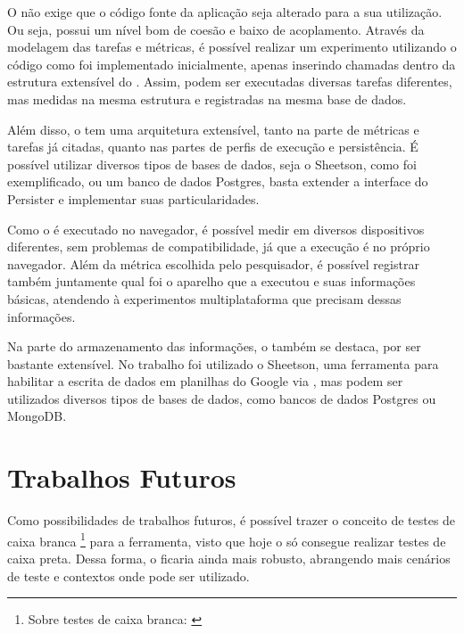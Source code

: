 \documentclass[12pt]{tcc}
\begin{document}
O  não exige que o código fonte da aplicação seja alterado para a sua utilização. Ou seja, possui um nível bom de coesão e baixo de acoplamento. Através da modelagem das tarefas e métricas, é possível realizar um experimento utilizando o código como foi implementado inicialmente, apenas inserindo chamadas dentro da estrutura extensível do . Assim, podem ser executadas diversas tarefas diferentes, mas medidas na mesma estrutura e registradas na mesma base de dados.

Além disso, o  tem uma arquitetura extensível, tanto na parte de métricas e tarefas já citadas, quanto nas partes de perfis de execução e persistência. É possível utilizar diversos tipos de bases de dados, seja o Sheetson, como foi exemplificado, ou um banco de dados Postgres, basta extender a interface do Persister e implementar suas particularidades. 

Como o  é executado no navegador, é possível medir em diversos dispositivos diferentes, sem problemas de compatibilidade, já que a execução é no próprio navegador. Além da métrica escolhida pelo pesquisador, é possível registrar também juntamente qual foi o aparelho que a executou e suas informações básicas, atendendo à experimentos multiplataforma que precisam dessas informações.

Na parte do armazenamento das informações, o  também se destaca, por ser bastante extensível. No trabalho foi utilizado o Sheetson, uma ferramenta para habilitar a escrita de dados em planilhas do Google via , mas podem ser utilizados diversos tipos de bases de dados, como bancos de dados Postgres ou MongoDB.




\section{Trabalhos Futuros}
\label{section:trabalhos-futuros}

Como possibilidades de trabalhos futuros, é possível trazer o conceito de testes de caixa branca \footnote{Sobre testes de caixa branca: \citep[Capítulo 21]{Sommerville2015Software}} para a ferramenta, visto que hoje o  só consegue realizar testes de caixa preta. Dessa forma, o  ficaria ainda mais robusto, abrangendo mais cenários de teste e contextos onde pode ser utilizado.

\end{document}
